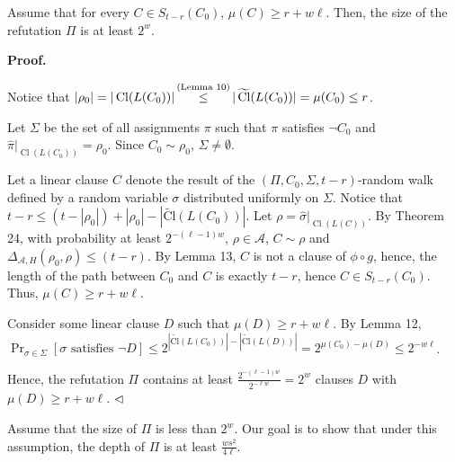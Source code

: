 Assume that for every $C\in S_{t-r}(C_{0})$, $\mu(C)\geq r+w\ell$. Then, the size of the refutation $\Pi$ is at least $2^{w}$.\par



\par\medskip\noindent\textbf{
Proof.}\par


Notice that $|\rho_{0}|=|\operatorname{Cl}(L(C_{0}))|\mathop{\leq}\limits^{\mbox{\scriptsize(Lemma~10)}}|\operatorname{\widetilde{Cl}}(L(C_{0}))|=\mu(C_{0})\leq r$.\par



Let $\Sigma$ be the set of all assignments $\pi$ such that $\pi$ satisfies $\lnot C_{0}$ and $\hat{\pi}|_{\operatorname{Cl}(L(C_{0}))}=\rho_{0}$. Since $C_{0}\sim\rho_{0}$, $\Sigma\neq\emptyset$.\par



Let a linear clause $C$ denote the result of the $(\Pi,C_{0},\Sigma,t-r)$-random walk defined by a random variable $\sigma$
distributed uniformly on $\Sigma$.
Notice that $t-r\leq(t-|\rho_{0}|)+|\rho_{0}|-|\operatorname{\widetilde{Cl}}(L(C_{0}))|$. Let $\rho=\hat{\sigma}|_{\operatorname{Cl}(L(C))}$.
By Theorem 24, with probability at least $2^{-(\ell-1)w}$, $\rho\in\mathcal{A}$,
$C\sim\rho$ and $\Delta_{\mathcal{A},H}(\rho_{0},\rho)\leq(t-r)$.
By Lemma 13, $C$ is not a clause of $\phi\circ g$,
hence, the length of the path between $C_{0}$ and $C$ is exactly $t-r$, hence $C\in S_{t-r}(C_{0})$.
Thus, $\mu(C)\geq r+w\ell$.\par



Consider some linear clause $D$ such that $\mu(D)\geq r+w\ell$.
By Lemma 12,
$\Pr_{\sigma\in\Sigma}[\mbox{$\sigma$ satisfies $\lnot D$}]\leq 2^{|\operatorname{\widetilde{Cl}}(L(C_{0}))|-|\operatorname{\widetilde{Cl}}(L(D))|}=2^{\mu(C_{0})-\mu(D)}\leq 2^{-w\ell}$.\par



Hence, the refutation $\Pi$ contains at least $\frac{2^{-(\ell-1)w}}{2^{-\ell w}}=2^{w}$ clauses $D$ with $\mu(D)\geq r+w\ell$.
$\hfill\vartriangleleft$\par



Assume that the size of $\Pi$ is less than $2^{w}$. Our goal is to show that under this assumption, the depth of
$\Pi$ is at least $\frac{ws^{2}}{4\ell}$.\par




